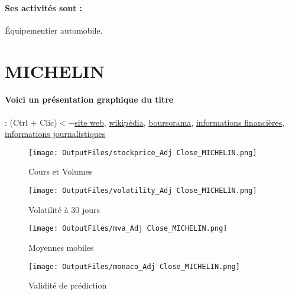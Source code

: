 \documentclass[11pt,a4paper]{report}%
\begin{document}
\paragraph{Ses activités sont : } Équipementier automobile. 
    
    \newpage

\section{MICHELIN}

\paragraph{Voici un présentation graphique du titre} : (Ctrl + Clic)$<-$\href{https://www.michelin.com/finance/}{site web}, \href{https://fr.wikipedia.org/wiki/Michelin}{wikipédia}, \href{https://www.boursorama.com/cours/1rPML}{boursorama}, \href{https://www.qwant.com/?q=site:https:%2f%2fwww.easybourse.com%2faction-societe%2fMICHELIN&t=web&client=ext-firefox-hp}{informations financières}, \href{https://bourse.lerevenu.com/cours-de-bourse/fiche-valeur-synthese/MICHELIN/ML-FR}{informations journalistiques}
\begin{figure}[!htb]
   \begin{minipage}{0.5\textwidth}
     \centering
     \texttt{[image: OutputFiles/stockprice\_Adj Close\_MICHELIN.png]}
     \caption{Cours et Volumes}\label{Fig:price_MICHELIN}
   \end{minipage}\hfill
   \begin{minipage}{0.5\textwidth}
     \centering
     \texttt{[image: OutputFiles/volatility\_Adj Close\_MICHELIN.png]}
     \caption{Volatilité à 30 jours}\label{Fig:volat_MICHELIN}
   \end{minipage}
\end{figure}
\begin{figure}[!htb]
   \begin{minipage}{0.5\textwidth}
     \centering
     \texttt{[image: OutputFiles/mva\_Adj Close\_MICHELIN.png]}
     \caption{Moyennes mobiles}\label{Fig:mva_MICHELIN}
   \end{minipage}\hfill
   \begin{minipage}{0.5\textwidth}
     \centering
     \texttt{[image: OutputFiles/monaco\_Adj Close\_MICHELIN.png]}
     \caption{Validité de prédiction}\label{Fig:prediction_MICHELIN}
   \end{minipage}
\end{figure}
\end{document}
